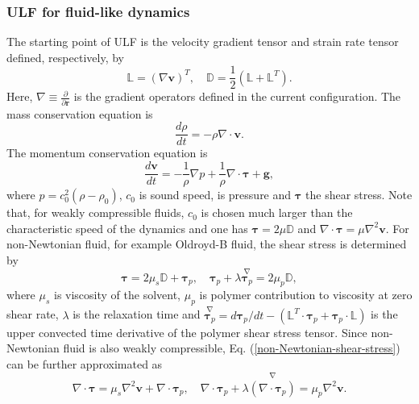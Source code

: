 \documentclass[12pt, a4paper,onecolumn]{article}
\begin{document}
\subsubsection{ULF for fluid-like dynamics}  
The starting point of ULF is the velocity gradient tensor and strain rate tensor defined, respectively, by 
%
\begin{equation}\label{strain-rate-tensor}
\mathbb{L} = (\nabla \mathbf{v})^{T}, \quad \mathbb{D}  = \frac{1}{2} (\mathbb{L}+ \mathbb{L}^{T}).
\end{equation}
%
Here, $\nabla \equiv \frac{\partial}{\partial \mathbf{r}}$ 
is the gradient operators defined in the current configuration.
The mass conservation equation is
%
\begin{equation}\label{mass-conservation-ULF}
\frac{d \rho}{d t}  = -\rho \nabla \cdot\mathbf{v}.
\end{equation}
%
The momentum conservation equation is 
%
\begin{equation}\label{momentum-conservation-ULF}
\frac{d \mathbf{v}}{d t}  = -\frac{1}{\rho}\nabla p + \frac{1}{\rho}\nabla \cdot \boldsymbol{\tau} + \mathbf{g},
\end{equation}
%
where $p = c^2_0(\rho - \rho_0)$, $c_0$ is sound speed, 
is pressure and $\boldsymbol{\tau}$ the shear stress. 
Note that, for weakly compressible fluids,  
$c_0$ is chosen much larger than the characteristic speed of the dynamics
and one has $\boldsymbol{\tau} = 2\mu \mathbb{D}$ 
and $\nabla \cdot \boldsymbol{\tau} = \mu \nabla^{2} \mathbf{v}$.
For non-Newtonian fluid, for example Oldroyd-B fluid,
the shear stress is determined by 
%
\begin{equation}\label{non-Newtonian-shear-stress}
\boldsymbol{\tau} = 2 \mu_s\mathbb{D} + \boldsymbol{\tau}_p, \quad \boldsymbol{\tau}_p + \lambda \overset{\scriptscriptstyle{\nabla}}{\boldsymbol{\tau}_p} = 2\mu_p \mathbb{D},
\end{equation}
%
where $\mu_s$ is viscosity of the solvent, $\mu_p$ is polymer contribution to viscosity at zero shear rate,
$\lambda$ is the relaxation time and 
$ \overset{\scriptscriptstyle{\nabla}}{\boldsymbol{\tau}_p} = d \boldsymbol{\tau}_p /dt 
- (\mathbb{L}^{T}\cdot \boldsymbol{\tau}_p +  \boldsymbol{\tau}_p \cdot \mathbb{L})$ is  
the upper convected time derivative of the polymer shear stress tensor.
Since non-Newtonian fluid is also weakly compressible, Eq. (\ref{non-Newtonian-shear-stress}) can be further approximated as
%
\begin{equation}\label{non-Newtonian-shear-stress-simplified}
\nabla \cdot \boldsymbol{\tau} = \mu_s\nabla^{2} \mathbf{v} + \nabla \cdot \boldsymbol{\tau}_p, 
\quad \nabla \cdot \boldsymbol{\tau}_p + \lambda \overset{\scriptscriptstyle{\nabla}}{(\nabla \cdot \boldsymbol{\tau}_p)} = \mu_p \nabla^{2} \mathbf{v}.
\end{equation}
%
\end{document}
